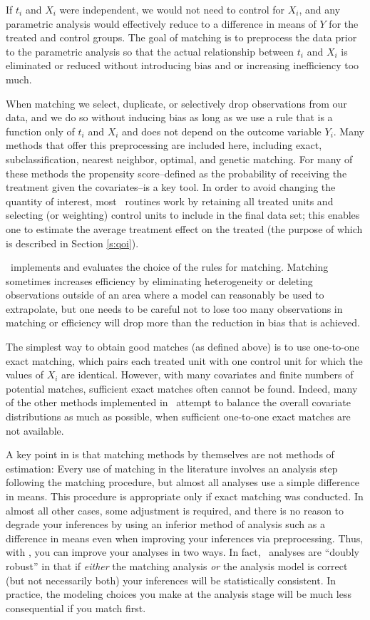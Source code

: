 If $t_i$ and $X_i$ were independent, we would not need to control for
$X_i$, and any parametric analysis would effectively reduce to a
difference in means of $Y$ for the treated and control groups.  The
goal of matching is to preprocess the data prior to the parametric
analysis so that the actual relationship between $t_i$ and $X_i$ is
eliminated or reduced without introducing bias and or increasing
inefficiency too much.  

When matching we select, duplicate, or selectively drop observations
from our data, and we do so without inducing bias as long as we use a
rule that is a function only of $t_i$ and $X_i$ and does not depend on
the outcome variable $Y_i$.  Many methods that offer this
preprocessing are included here, including exact, subclassification,
nearest neighbor, optimal, and genetic
matching.  For many of these methods the propensity score--defined as the
probability of receiving the treatment given the covariates--is a key tool.
In order to avoid changing the quantity of interest, most
\MatchIt\ routines work by retaining all treated units and selecting (or weighting)
control units to include in the final data set; this enables
one to estimate the average treatment effect on the treated (the purpose
of which is described in Section \ref{s:qoi}).

\MatchIt\ implements and evaluates the choice of the rules for
matching.  Matching sometimes increases efficiency by eliminating
heterogeneity or deleting observations outside of an area where a
model can reasonably be used to extrapolate, but one needs to be
careful not to lose too many observations in matching or efficiency
will drop more than the reduction in bias that is achieved.

The simplest way to obtain good matches (as defined above) is to use
one-to-one exact matching, which pairs each treated unit with one
control unit for which the values of $X_i$ are identical.  However,
with many covariates and finite numbers of potential matches, 
sufficient exact matches often cannot be found.  Indeed, many of the
other methods implemented in \MatchIt\ attempt to balance the overall
covariate distributions as much as possible, when sufficient
one-to-one exact matches are not available.

A key point in \citet*{HoImaKin07} is that matching methods by
themselves are not methods of estimation: Every use of matching in the
literature involves an analysis step following the matching procedure,
but almost all analyses use a simple difference in means.  This
procedure is appropriate only if exact matching was conducted.  In
almost all other cases, some adjustment is required, and there is no
reason to degrade your inferences by using an inferior method of
analysis such as a difference in means even when improving your
inferences via preprocessing.  Thus, with \MatchIt, you can improve
your analyses in two ways.  In fact, \MatchIt\ analyses are ``doubly
robust'' in that if \emph{either} the matching analysis \emph{or} the
analysis model is correct (but not necessarily both) your inferences
will be statistically consistent.  In practice, the modeling choices
you make at the analysis stage will be much less consequential if you
match first.


